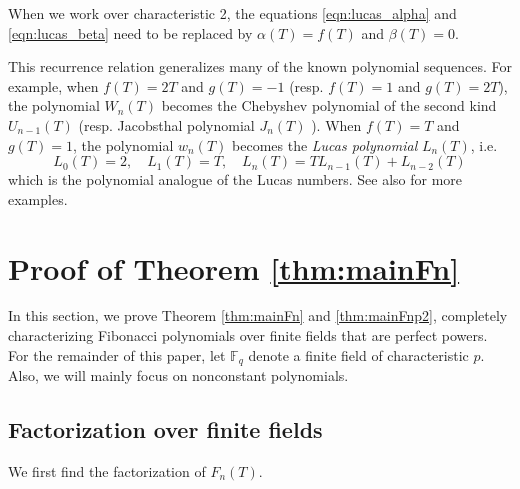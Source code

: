 \documentclass[letterpaper, 10pt]{article}
\newcommand{\bF}{\mathbb{F}}
\newcommand{\1}{\mathds{1}}	%
\theoremstyle{definition}
\theoremstyle{remark}
\begin{document}
When we work over characteristic 2, the equations \eqref{eqn:lucas_alpha} and \eqref{eqn:lucas_beta} need to be replaced by $\alpha(T) = f(T)$ and $\beta(T) = 0$.

This recurrence relation generalizes many of the known polynomial sequences.
For example, when $f(T) = 2T$ and $g(T) = -1$ (resp. $f(T) = 1$ and $g(T) = 2T$), the polynomial $W_n(T)$ becomes the Chebyshev polynomial of the second kind $U_{n-1}(T)$ (resp. Jacobsthal polynomial $J_n(T)$ \cite{horadam1997jacobsthal}).
When $f(T) = T$ and $g(T) = 1$, the polynomial $w_n(T)$ becomes the \emph{Lucas polynomial} $L_n(T)$, i.e.
\begin{equation}
    \label{eqn:lucas_poly}
    L_0(T) = 2, \quad L_1(T) = T, \quad L_n(T) = T L_{n-1}(T) + L_{n-2}(T)
\end{equation}
which is the polynomial analogue of the Lucas numbers.
See also \cite[Table 1]{Horadam1996} for more examples.

\section{Proof of Theorem \ref{thm:mainFn}}
\label{sec:main}

In this section, we prove Theorem \ref{thm:mainFn} and \ref{thm:mainFnp2}, completely characterizing Fibonacci polynomials over finite fields that are perfect powers. For the remainder of this paper, let $\bF_q$ denote a finite field of characteristic $p$. Also, we will mainly focus on nonconstant polynomials.

\subsection{Factorization over finite fields}

We first find the factorization of $F_n(T)$.
\end{document}
